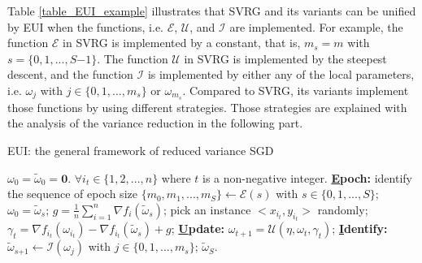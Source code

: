 \documentclass[letterpaper]{article}
\begin{document}
Table \ref{table_EUI_example} illustrates that SVRG and  its variants can be unified by EUI when  the functions, i.e. $\mathcal{E}$, $\mathcal{U}$, and $\mathcal{I}$ are implemented. For example,  the function $\mathcal{E}$ in SVRG is implemented by a constant, that is, $m_s\mathrm{=}m$ with $s\mathrm{=}\{0,1, ..., S\mathrm{-}1\}$. The function $\mathcal{U}$ in SVRG is  implemented by the steepest descent, and the function $\mathcal{I}$ is implemented by either any of the local parameters, i.e. $\omega_j$ with $j\in\{0,1, ..., m_s\}$ or $\omega_{m_s}$.  Compared to  SVRG, its variants implement those functions by using different strategies. Those strategies are explained with the analysis of the variance reduction in the following part. 




\begin{algorithm}[t]
    \caption{EUI: the general framework of  reduced variance SGD}
    \label{algorithm_EUI}
    \begin{algorithmic}[1]
        \Require $\omega_0\mathrm{=}\tilde{\omega}_0\mathrm{=}\mathbf{0}$. $\forall i_t\mathrm{\in}\{1,2, ..., n\}$ where $t$ is a non-negative integer.
        \State \textbf{\uline{E}poch:} identify the sequence of  epoch size $\{m_0, m_1, ..., m_S\}\mathrm{\leftarrow} \mathcal{E}(s)$ with $s\in\{0,1, ..., S\}$;
            \State $\omega_0=\tilde{\omega}_s$;
            \State $g=\frac{1}{n}\sum\limits_{i=1}^n\nabla f_i(\tilde{\omega}_s)$;
                \State pick an instance $\mathrm{<}x_{i_t}, y_{i_t}\mathrm{>}$ randomly;
                \State $\gamma_{t}=\nabla f_{i_t}(\omega_{i_t})-\nabla f_{i_t}(\tilde{\omega}_s)+g$;
                \State \textbf{\uline{U}pdate:} $\omega_{t+1}=\mathcal{U}(\eta, \omega_{t}, \gamma_{t})$;
            \EndFor
            \State \textbf{\uline{I}dentify:} $\tilde{\omega}_{s\mathrm{+}1}\mathrm{\leftarrow}\mathcal{I}(\omega_j)$ with $j\mathrm{\in}\{0,1, ..., m_s\}$;
        \EndFor
        \Return $\tilde{\omega}_S$.
    \end{algorithmic}
\end{algorithm}
\end{document}
